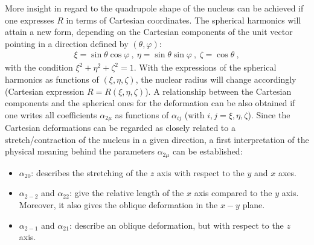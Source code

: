 More insight in regard to the quadrupole shape of the nucleus can be achieved if one expresses $R$ in terms of Cartesian coordinates. The spherical harmonics will attain a new form, depending on the Cartesian components of the unit vector pointing in a direction defined by $(\theta,\varphi)$:
\begin{align}
    \xi=\sin\theta\cos\varphi\ ,\ \eta=\sin\theta\sin\varphi\ ,\ \zeta=\cos\theta\ ,
\end{align}
with the condition $\xi^2+\eta^2+\zeta^2=1$. With the expressions of the spherical harmonics as functions of $(\xi,\eta,\zeta)$, the nuclear radius will change accordingly (Cartesian expression $R=R(\xi,\eta,\zeta)$). A relationship between the Cartesian components and the spherical ones for the deformation can be also obtained if one writes all coefficients $\alpha_{2\mu}$ as functions of $\alpha_{ij}$ (with $i,j=\xi,\eta,\zeta$). Since the Cartesian deformations can be regarded as closely related to a stretch/contraction of the nucleus in a given direction, a first interpretation of the physical meaning behind the parameters $\alpha_{2\mu}$ can be established:
\begin{itemize}
    \item $\alpha_{20}$: describes the stretching of the $z$ axis with respect to the $y$ and $x$ axes.
    \item $\alpha_{2-2}$ and $\alpha_{22}$: give the relative length of the $x$ axis compared to the $y$ axis. Moreover, it also gives the oblique deformation in the $x-y$ plane.
    \item $\alpha_{2-1}$ and $\alpha_{21}$: describe an oblique deformation, but with respect to the $z$ axis.
\end{itemize}

